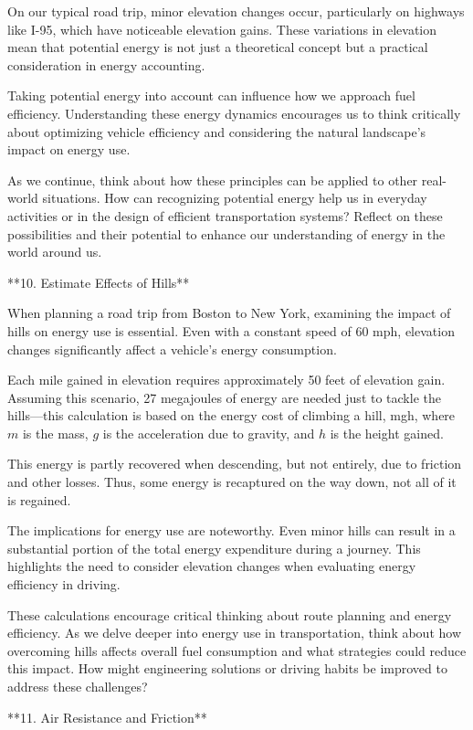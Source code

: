 \begin{tcolorbox}[size=title,opacityfill=0.05,breakable]
On our typical road trip, minor elevation changes occur, particularly on highways like I-95, which have noticeable elevation gains. These variations in elevation mean that potential energy is not just a theoretical concept but a practical consideration in energy accounting.

Taking potential energy into account can influence how we approach fuel efficiency. Understanding these energy dynamics encourages us to think critically about optimizing vehicle efficiency and considering the natural landscape's impact on energy use.

As we continue, think about how these principles can be applied to other real-world situations. How can recognizing potential energy help us in everyday activities or in the design of efficient transportation systems? Reflect on these possibilities and their potential to enhance our understanding of energy in the world around us.

**10. Estimate Effects of Hills**

When planning a road trip from Boston to New York, examining the impact of hills on energy use is essential. Even with a constant speed of 60 mph, elevation changes significantly affect a vehicle's energy consumption. 

Each mile gained in elevation requires approximately 50 feet of elevation gain. Assuming this scenario, 27 megajoules of energy are needed just to tackle the hills—this calculation is based on the energy cost of climbing a hill, mgh, where \( m \) is the mass, \( g \) is the acceleration due to gravity, and \( h \) is the height gained. 

This energy is partly recovered when descending, but not entirely, due to friction and other losses. Thus, some energy is recaptured on the way down, not all of it is regained. 

The implications for energy use are noteworthy. Even minor hills can result in a substantial portion of the total energy expenditure during a journey. This highlights the need to consider elevation changes when evaluating energy efficiency in driving.

These calculations encourage critical thinking about route planning and energy efficiency. As we delve deeper into energy use in transportation, think about how overcoming hills affects overall fuel consumption and what strategies could reduce this impact. How might engineering solutions or driving habits be improved to address these challenges?

**11. Air Resistance and Friction**


\end{tcolorbox}

